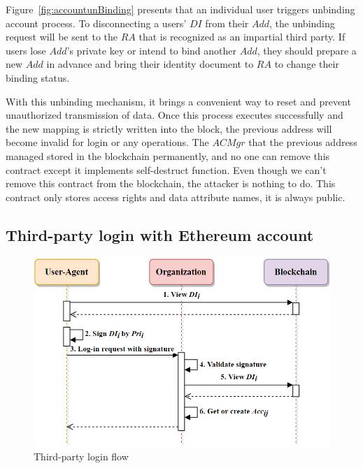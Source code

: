     Figure~\ref{fig:accountunBinding} presents that an individual user triggers unbinding account process. To disconnecting a users' \(DI\) from their \(Add\), the unbinding request will be sent to the \(RA\) that is recognized as an impartial third party. If users lose \(Add\)'s private key or intend to bind another \(Add\), they should prepare a new \(Add\) in advance and bring their identity document to \(RA\) to change their binding status.
    \par 
    With this unbinding mechanism, it brings a convenient way to reset and prevent unauthorized transmission of data. Once this process executes successfully and the new mapping is strictly written into the block, the previous address will become invalid for login or any operations. The \(ACMgr\) that the previous address managed stored in the blockchain permanently, and no one can remove this contract except it implements self-destruct function. Even though we can't remove this contract from the blockchain, the attacker is nothing to do. This contract only stores access rights and data attribute names, it is always public.

    \newpage

    \subsection{Third-party login with Ethereum account}
    \begin{figure}[htb]
        \centering
        \includegraphics[height=!,width=0.8\linewidth,keepaspectratio=true]{figures/Third_party_login.png}
        \caption{{\footnotesize Third-party login flow}}
        \label{fig:thirdPartyLogin}
    \end{figure}

